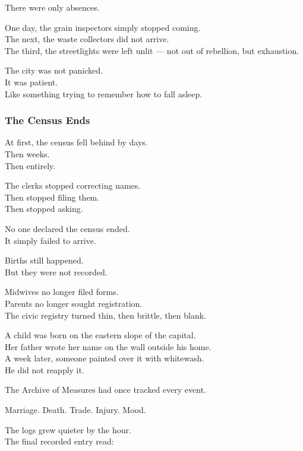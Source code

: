 \documentclass[12pt]{article}
\begin{document}
There were only absences.

One day, the grain inspectors simply stopped coming.\\
The next, the waste collectors did not arrive.\\
The third, the streetlights were left unlit — not out of rebellion, but exhaustion.

The city was not panicked.\\
It was patient.\\
Like something trying to remember how to fall asleep.

\dotfill

\subsubsection{The Census Ends}

At first, the census fell behind by days.\\
Then weeks.\\
Then entirely.

The clerks stopped correcting names.\\
Then stopped filing them.\\
Then stopped asking.

No one declared the census ended.\\
It simply failed to arrive.

\vspace{1em}

Births still happened.\\
But they were not recorded.

Midwives no longer filed forms.\\
Parents no longer sought registration.\\
The civic registry turned thin, then brittle, then blank.

A child was born on the eastern slope of the capital.\\
Her father wrote her name on the wall outside his home.\\
A week later, someone painted over it with whitewash.\\
He did not reapply it.

\vspace{1em}

The Archive of Measures had once tracked every event.

Marriage. Death. Trade. Injury. Mood.

The logs grew quieter by the hour.\\
The final recorded entry read:
\end{document}
